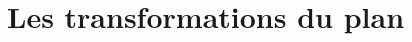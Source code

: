 \documentclass[../math2.tex]{subfiles}
\begin{document}
\chapter{Les transformations du plan}











\end{document}
